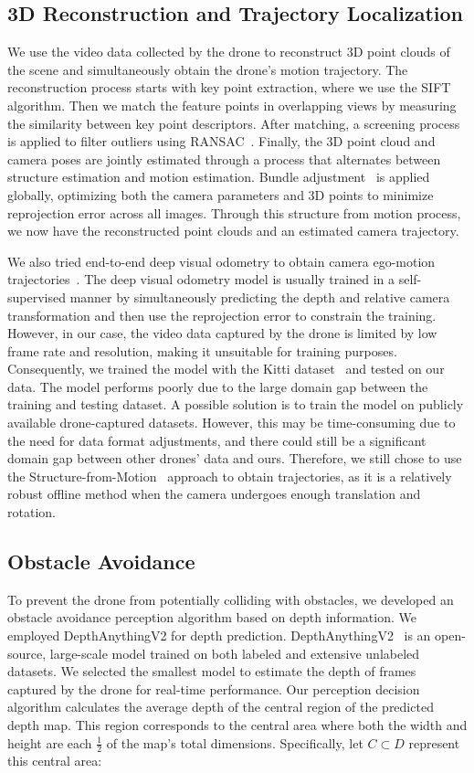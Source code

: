 \documentclass[conference]{IEEEtran}
\begin{document}
\subsection{3D Reconstruction and Trajectory Localization}
We use the video data collected by the drone to reconstruct 3D point clouds of the scene and simultaneously obtain the drone's motion trajectory. The reconstruction process starts with key point extraction, where we use the SIFT \cite{SIFT} algorithm. Then we match the feature points in overlapping views by measuring the similarity between key point descriptors. After matching, a screening process is applied to filter outliers using RANSAC~\cite{Ransac}. Finally, the 3D point cloud and camera poses are jointly estimated through a process that alternates between structure estimation and motion estimation. Bundle adjustment~\cite{ba} is applied globally, optimizing both the camera parameters and 3D points to minimize reprojection error across all images. Through this structure from motion process, we now have the reconstructed point clouds and an estimated camera trajectory.

We also tried end-to-end deep visual odometry to obtain camera ego-motion trajectories~\cite{scsfm}. The deep visual odometry model is usually trained in a self-supervised manner by simultaneously predicting the depth and relative camera transformation and then use the reprojection error to constrain the training. However, in our case, the video data captured by the drone is limited by low frame rate and resolution, making it unsuitable for training purposes. Consequently, we trained the model with the Kitti dataset~\cite{kitti} and tested on our data. The model performs poorly due to the large domain gap between the training and testing dataset. A possible solution is to train the model on publicly available drone-captured datasets. However, this may be time-consuming due to the need for data format adjustments, and there could still be a significant domain gap between other drones' data and ours. Therefore, we still chose to use the Structure-from-Motion~\cite{colmap} approach to obtain trajectories, as it is a relatively robust offline method when the camera undergoes enough translation and rotation.

\subsection{Obstacle Avoidance}
To prevent the drone from potentially colliding with obstacles, we developed an obstacle avoidance perception algorithm based on depth information. We employed DepthAnythingV2 for depth prediction. DepthAnythingV2~\cite{depthanything} is an open-source, large-scale model trained on both labeled and extensive unlabeled datasets. We selected the smallest model to estimate the depth of frames captured by the drone for real-time performance. Our perception decision algorithm calculates the average depth of the central region of the predicted depth map. This region corresponds to the central area where both the width and height are each \( \frac{1}{2} \) of the map's total dimensions. Specifically, let \( C \subset D \) represent this central area:
\end{document}
